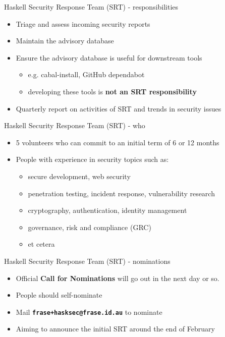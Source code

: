 \documentclass[ignorenonframetext,aspectratio=169,12pt]{beamer}
\begin{document}
\begin{frame}{Haskell Security Response Team (SRT) - responsibilities}

\begin{itemize}
    \item Triage and assess incoming security reports
    \item Maintain the advisory database
    \item Ensure the advisory database is useful for downstream tools
        \begin{itemize}
            \item e.g. cabal-install, GitHub dependabot
            \item developing these tools is {\bf not an SRT
                responsibility}
        \end{itemize}
    \item Quarterly report on activities of SRT and trends in
        security issues
\end{itemize}

\end{frame}

\begin{frame}{Haskell Security Response Team (SRT) - who}

\begin{itemize}
    \item 5 volunteers who can commit to an initial term of 6 or
        12 months
    \item People with experience in security topics such as:
        \begin{itemize}
            \item secure development, web security
            \item penetration testing, incident response,
                vulnerability research
            \item cryptography, authentication, identity management
            \item governance, risk and compliance (GRC)
            \item et cetera
        \end{itemize}
\end{itemize}

\end{frame}

\begin{frame}{Haskell Security Response Team (SRT) - nominations}

\begin{itemize}
    \item Official {\bf Call for Nominations} will go out in the
        next day or so.
    \item People should self-nominate
    \item Mail \textbf{\texttt{frase+hasksec@frase.id.au}} to nominate
    \item Aiming to announce the initial SRT around the end of February
\end{itemize}

\end{frame}
\end{document}
